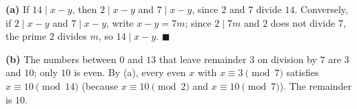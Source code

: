 \textbf{(a)} If $14\mid x-y$, then $2\mid x-y$ and $7\mid x-y$, since $2$ and $7$ divide $14$. Conversely, if $2\mid x-y$ and $7\mid x-y$, write $x-y=7m$; since $2\mid7m$ and $2$ does not divide $7$, the prime $2$ divides $m$, so $14\mid x-y$. $\blacksquare$

\textbf{(b)} The numbers between $0$ and $13$ that leave remainder $3$ on division by $7$ are $3$ and $10$; only $10$ is even. By (a), every even $x$ with $x\equiv3\pmod7$ satisfies $x\equiv10\pmod{14}$ (because $x\equiv10\pmod2$ and $x\equiv10\pmod7$). The remainder is $\boxed{10}$.
